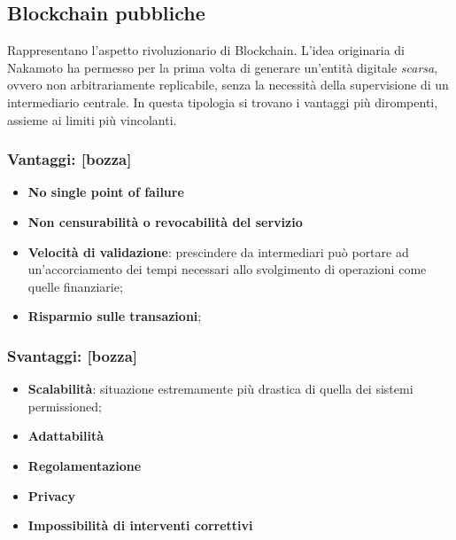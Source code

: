 	\subsection{Blockchain pubbliche}
		Rappresentano l'aspetto rivoluzionario di Blockchain. L'idea originaria di Nakamoto ha permesso per la prima volta di generare un'entità digitale \emph{scarsa}, ovvero non arbitrariamente replicabile, senza la necessità della supervisione di un intermediario centrale. In questa tipologia si trovano i vantaggi più dirompenti, assieme ai limiti più vincolanti.
		\subsubsection{Vantaggi: [bozza]}
			\begin{itemize}
				\item \textbf{No single point of failure}
				\item \textbf{Non censurabilità o revocabilità del servizio}
				\item \textbf{Velocità di validazione}: prescindere da intermediari può portare ad un'accorciamento dei tempi necessari allo svolgimento di operazioni come quelle finanziarie;
				\item \textbf{Risparmio sulle transazioni};
			\end{itemize}
		\subsubsection{Svantaggi: [bozza]}
			\begin{itemize}
				\item \textbf{Scalabilità}: situazione estremamente più drastica di quella dei sistemi permissioned; 
				\item \textbf{Adattabilità}
				\item \textbf{Regolamentazione}
				\item \textbf{Privacy}
				\item \textbf{Impossibilità di interventi correttivi}
			\end{itemize}
